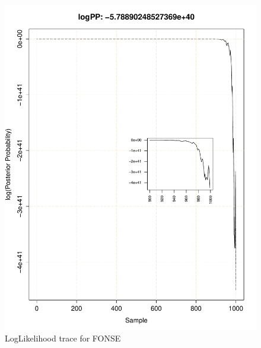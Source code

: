 \documentclass[11pt]{labbook}
\begin{document}
    \begin{figure}
        \centering
        \includegraphics[scale=.65]{FONSE_Plots/2016/June_27/Run1_LogLikeTrace}
        \caption{LogLikelihood trace for FONSE}
        \label{fig:JUN27_FLOG}
    \end{figure}
\end{document}
